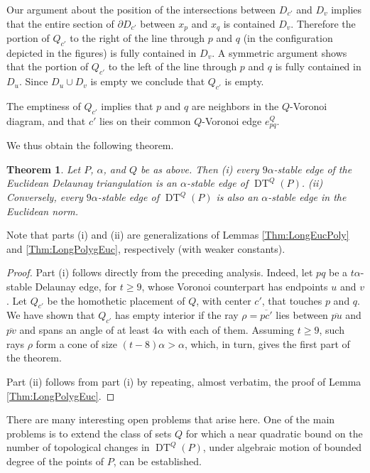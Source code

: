 \documentclass[letter,11pt]{article}
\newtheorem{theorem}{Theorem}[section]
\def\DT{\mathop{\mathrm{DT}}}
\begin{document}
Our argument about the position of the intersections between
$D_{c'}$ and $D_v$ implies that the entire section of 
$\partial D_{c'}$ between $x_p$ and $x_q$ is contained $D_v$. Therefore
the portion of $Q_{c'}$ to the right of the line through $p$ and $q$ (in the configuration depicted in the figures) is fully contained in $D_v$.
A symmetric argument shows that the portion of 
$Q_{c'}$ to the left of the line 
through $p$ and $q$ is fully contained in $D_u$. Since $D_u \cup D_v$ is empty we conclude that
$Q_{c'}$ is empty.

 The emptiness of $Q_{c'}$ implies that $p$ and 
$q$ are neighbors in the $Q$-Voronoi diagram, and that $c'$ lies on 
their common $Q$-Voronoi edge $e^Q_{pq}$.


We thus obtain the following theorem.
\begin{theorem} 
Let $P$, $\alpha$, and $Q$ be as above. Then (i) every $9\alpha$-stable edge of the Euclidean Delaunay triangulation is an $\alpha$-stable edge of $\DT^Q(P)$. (ii) Conversely, every $9\alpha$-stable edge of $\DT^Q(P)$ is also an $\alpha$-stable edge in the Euclidean norm.
\end{theorem}
Note that parts (i) and (ii) are generalizations of Lemmas \ref{Thm:LongEucPoly} and \ref{Thm:LongPolygEuc}, respectively (with weaker constants).
\begin{proof}
Part (i) follows directly from the preceding analysis. Indeed, let $pq$ be a $t\alpha$-stable Delaunay edge, for $t\geq 9$, whose Voronoi counterpart has endpoints $u$ and $v$. Let $Q_{c'}$ be the homothetic placement of $Q$, with center $c'$, that touches $p$ and $q$. We have shown that $Q_{c'}$ has empty interior if the ray $\rho=\overline{pc'}$ lies between $\overline{pu}$ and $\overline{pv}$ and spans an angle of at least $4\alpha$ with each of them. Assuming $t\geq 9$, such rays $\rho$ form a cone of size $(t-8)\alpha>\alpha$, which, in turn, gives the first part of the theorem. 

Part (ii) follows from part (i) by repeating, almost verbatim, the proof of Lemma \ref{Thm:LongPolygEuc}.
\end{proof}

There are many interesting open problems that arise here. One of the main problems is to extend the class of sets $Q$ for which a near quadratic bound on the number of topological changes in $\DT^Q(P)$, under algebraic motion of bounded degree of the points of $P$, can be established.
\end{document}
